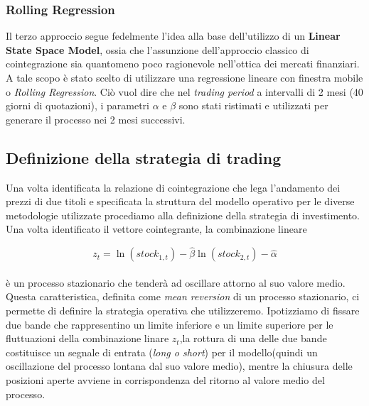 \documentclass[]{article}
\begin{document}
\subsubsection*{Rolling Regression}
Il terzo approccio segue fedelmente l'idea alla base dell'utilizzo di un \textbf{Linear State Space Model}, ossia che l'assunzione dell'approccio classico di cointegrazione sia quantomeno poco ragionevole nell'ottica dei mercati finanziari.
A tale scopo è stato scelto di utilizzare una regressione lineare con finestra mobile o \textit{Rolling Regression}. Ciò vuol dire che nel \textit{trading period} a intervalli di 2 mesi (40 giorni di quotazioni), i parametri $\alpha$ e $\beta$ sono stati ristimati e utilizzati per generare il processo nei 2 mesi successivi. 


\subsection{Definizione della strategia di trading}
Una volta identificata la relazione di cointegrazione che lega l’andamento dei prezzi
di due titoli e specificata la struttura del modello operativo per le diverse metodologie utilizzate procediamo alla definizione della strategia di investimento. 
\\
Una volta identificato il vettore cointegrante, la combinazione lineare

\begin{equation} 
	z_t= \ln(stock_{1,t}) - \hat{\beta}\ln(stock_{2,t}) - \hat{\alpha} \label{spread}
\end{equation}
\
\\
è un processo stazionario che tenderà ad oscillare attorno al suo valore medio.
\\
Questa caratteristica, definita come \textit{mean reversion} di un processo stazionario, ci permette di definire la strategia operativa che utilizzeremo.
Ipotizziamo di fissare due bande che rappresentino un limite inferiore e un limite superiore per le fluttuazioni della combinazione linare $z_t$,la rottura di una delle due bande costituisce un segnale di entrata (\textit{long o short}) per il modello(quindi un oscillazione del processo lontana dal suo valore medio), mentre la chiusura delle posizioni aperte avviene in corrispondenza del ritorno al valore medio del processo. 
\end{document}
